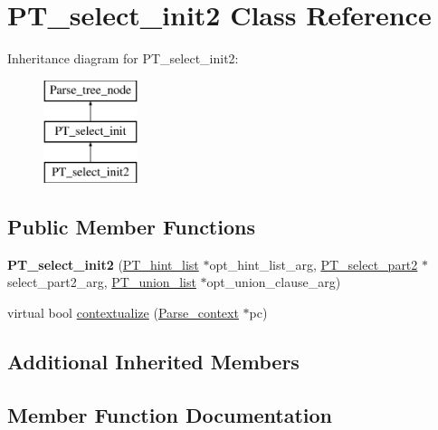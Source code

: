 \hypertarget{classPT__select__init2}{}\section{P\+T\+\_\+select\+\_\+init2 Class Reference}
\label{classPT__select__init2}
Inheritance diagram for P\+T\+\_\+select\+\_\+init2\+:\begin{figure}[H]
\begin{center}
\leavevmode
\includegraphics[height=3.000000cm]{classPT__select__init2}
\end{center}
\end{figure}
\subsection*{Public Member Functions}
\begin{DoxyCompactItemize}
\item 
\mbox{\label{classPT__select__init2_a9a7580ee1e1c231c4426b67cf1a14a36}} 
{\bfseries P\+T\+\_\+select\+\_\+init2} (\mbox{\hyperlink{classPT__hint__list}{P\+T\+\_\+hint\+\_\+list}} $\ast$opt\+\_\+hint\+\_\+list\+\_\+arg, \mbox{\hyperlink{classPT__select__part2}{P\+T\+\_\+select\+\_\+part2}} $\ast$select\+\_\+part2\+\_\+arg, \mbox{\hyperlink{classPT__union__list}{P\+T\+\_\+union\+\_\+list}} $\ast$opt\+\_\+union\+\_\+clause\+\_\+arg)
\item 
virtual bool \mbox{\hyperlink{classPT__select__init2_a9ec1334ca637b72c228fc8b87d8aef3a}{contextualize}} (\mbox{\hyperlink{structParse__context}{Parse\+\_\+context}} $\ast$pc)
\end{DoxyCompactItemize}
\subsection*{Additional Inherited Members}


\subsection{Member Function Documentation}
\mbox{\label{classPT__select__init2_a9ec1334ca637b72c228fc8b87d8aef3a}} 
